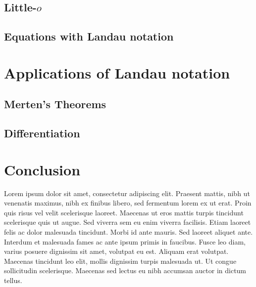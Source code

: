 \documentclass{article}
\theoremstyle{definition}
\begin{document}
\subsection{Little-$o$}\label{ssec:littleo}

\subsection{Equations with Landau notation}\label{ssec:equations}

\section{Applications of Landau notation}\label{sec:applications}

\subsection{Merten's Theorems}\label{ssec:merten}

\subsection{Differentiation}\label{ssec:differentiation}

\section{Conclusion}\label{ssec:conclusion}

Lorem ipsum dolor sit amet, consectetur adipiscing elit. Praesent mattis, nibh ut venenatis maximus, nibh ex finibus libero, sed fermentum lorem ex ut erat. Proin quis risus vel velit scelerisque laoreet. Maecenas ut eros mattis turpis tincidunt scelerisque quis ut augue. Sed viverra sem eu enim viverra facilisis. Etiam laoreet felis ac dolor malesuada tincidunt. Morbi id ante mauris. Sed laoreet aliquet ante. Interdum et malesuada fames ac ante ipsum primis in faucibus. Fusce leo diam, varius posuere dignissim sit amet, volutpat eu est. Aliquam erat volutpat. Maecenas tincidunt leo elit, mollis dignissim turpis malesuada ut. Ut congue sollicitudin scelerisque. Maecenas sed lectus eu nibh accumsan auctor in dictum tellus.

\nocite{*}
\printbibliography
\end{document}
